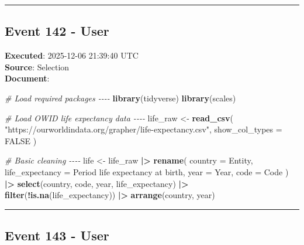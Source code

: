 \documentclass[
  11pt,
]{article}
\newenvironment{Shaded}{\begin{snugshade}}{\end{snugshade}}
\newcommand{\AttributeTok}[1]{\textcolor[rgb]{0.13,0.29,0.53}{#1}}
\newcommand{\CommentTok}[1]{\textcolor[rgb]{0.56,0.35,0.01}{\textit{#1}}}
\newcommand{\ConstantTok}[1]{\textcolor[rgb]{0.56,0.35,0.01}{#1}}
\newcommand{\FunctionTok}[1]{\textcolor[rgb]{0.13,0.29,0.53}{\textbf{#1}}}
\newcommand{\NormalTok}[1]{#1}
\newcommand{\OtherTok}[1]{\textcolor[rgb]{0.56,0.35,0.01}{#1}}
\newcommand{\SpecialCharTok}[1]{\textcolor[rgb]{0.81,0.36,0.00}{\textbf{#1}}}
\newcommand{\StringTok}[1]{\textcolor[rgb]{0.31,0.60,0.02}{#1}}
\begin{document}
\begin{center}\rule{0.5\linewidth}{0.5pt}\end{center}

\subsection{Event 142 - User}\label{event-142---user}

\textbf{Executed}: 2025-12-06 21:39:40 UTC\\
\textbf{Source}: Selection\\
\textbf{Document}:

\begin{Shaded}
\begin{Highlighting}[]
\CommentTok{\# Load required packages {-}{-}{-}{-}}
\FunctionTok{library}\NormalTok{(tidyverse)}
\FunctionTok{library}\NormalTok{(scales)}

\CommentTok{\# Load OWID life expectancy data {-}{-}{-}{-}}
\NormalTok{life\_raw }\OtherTok{\textless{}{-}} \FunctionTok{read\_csv}\NormalTok{(}
  \StringTok{"https://ourworldindata.org/grapher/life{-}expectancy.csv"}\NormalTok{,}
  \AttributeTok{show\_col\_types =} \ConstantTok{FALSE}
\NormalTok{)}

\CommentTok{\# Basic cleaning {-}{-}{-}{-}}
\NormalTok{life }\OtherTok{\textless{}{-}}\NormalTok{ life\_raw }\SpecialCharTok{|\textgreater{}}
  \FunctionTok{rename}\NormalTok{(}
    \AttributeTok{country =}\NormalTok{ Entity,}
    \AttributeTok{life\_expectancy =} \StringTok{\textasciigrave{}}\AttributeTok{Period life expectancy at birth}\StringTok{\textasciigrave{}}\NormalTok{,}
    \AttributeTok{year =}\NormalTok{ Year,}
    \AttributeTok{code =}\NormalTok{ Code}
\NormalTok{  ) }\SpecialCharTok{|\textgreater{}}
  \FunctionTok{select}\NormalTok{(country, code, year, life\_expectancy) }\SpecialCharTok{|\textgreater{}}
  \FunctionTok{filter}\NormalTok{(}\SpecialCharTok{!}\FunctionTok{is.na}\NormalTok{(life\_expectancy)) }\SpecialCharTok{|\textgreater{}}
  \FunctionTok{arrange}\NormalTok{(country, year)}
\end{Highlighting}
\end{Shaded}

\begin{center}\rule{0.5\linewidth}{0.5pt}\end{center}

\subsection{Event 143 - User}\label{event-143---user}
\end{document}
